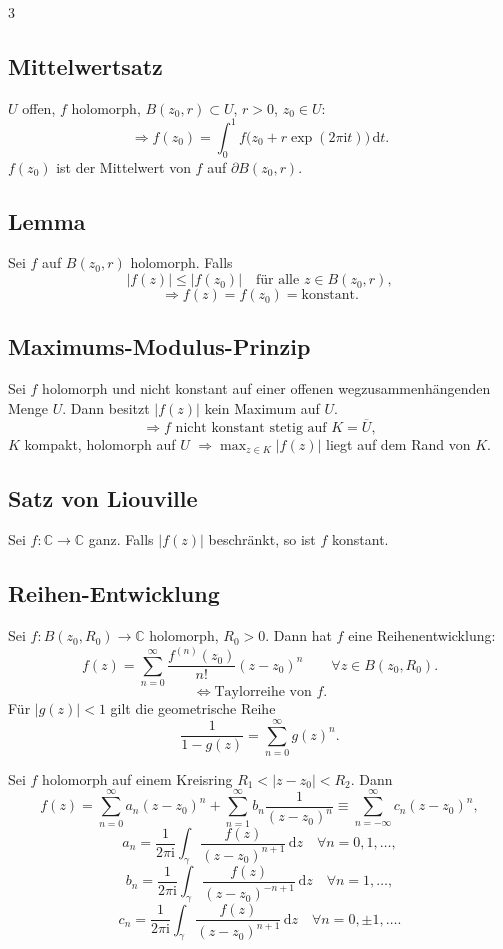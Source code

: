 \documentclass[a4paper,landscape]{article}
\newcommand{\C}{\mathbb C}
\newcommand{\dd}{\,\mathrm d}
\newcommand{\ii}{\mathrm i}
\begin{document}
\begin{multicols*}{3}
\subsection*{Mittelwertsatz}
$U$ offen, $f$ holomorph, $B(z_0,r)\subset U$, $r>0$, $z_0\in U$:
\[
\Rightarrow f(z_0)=\int_0^1 f\bigl(z_0+r\exp(2\pi\ii t)\bigr)\dd t.
\]
$f(z_0)$ ist der Mittelwert von $f$ auf $\partial B(z_0,r)$.

\subsection*{Lemma}
Sei $f$ auf $B(z_0,r)$ holomorph. Falls
\[
|f(z)|\le |f(z_0)|\quad\text{für alle }z\in B(z_0,r),
\]
\[
\Rightarrow f(z)=f(z_0)=\text{konstant}.
\]

\subsection*{Maximums-Modulus-Prinzip}
Sei $f$ holomorph und nicht konstant auf einer offenen wegzusammenhängenden Menge $U$. Dann besitzt $|f(z)|$ kein Maximum auf $U$.
\[
\Rightarrow f\text{ nicht konstant stetig auf }K=\overline U,
\]
$K$ kompakt, holomorph auf $U$ $\Rightarrow \max_{z\in K}|f(z)|$ liegt auf dem Rand von $K$.

\subsection*{Satz von Liouville}
Sei $f:\C\to\C$ ganz. Falls $|f(z)|$ beschränkt, so ist $f$ konstant.

\subsection*{Reihen-Entwicklung}
Sei $f:B(z_0,R_0)\to\C$ holomorph, $R_0>0$. Dann hat $f$ eine Reihenentwicklung:
\[
f(z)=\sum_{n=0}^{\infty}\frac{f^{(n)}(z_0)}{n!}(z-z_0)^n\qquad\forall z\in B(z_0,R_0).
\]
\[
\Leftrightarrow \text{Taylorreihe von }f.
\]
Für $|g(z)|<1$ gilt die geometrische Reihe
\[
\frac{1}{1-g(z)}=\sum_{n=0}^{\infty}g(z)^n.
\]

Sei $f$ holomorph auf einem Kreisring $R_1<|z-z_0|<R_2$. Dann
\[
f(z)=\sum_{n=0}^{\infty}a_n(z-z_0)^n+\sum_{n=1}^{\infty}b_n\frac{1}{(z-z_0)^n}
\equiv \sum_{n=-\infty}^{\infty}c_n(z-z_0)^n,
\]
\[
a_n=\frac{1}{2\pi\ii}\int_\gamma\frac{f(z)}{(z-z_0)^{n+1}}\dd z\quad\forall n=0,1,\ldots,
\]
\[
b_n=\frac{1}{2\pi\ii}\int_\gamma\frac{f(z)}{(z-z_0)^{-n+1}}\dd z\quad\forall n=1,\ldots,
\]
\[
c_n=\frac{1}{2\pi\ii}\int_\gamma\frac{f(z)}{(z-z_0)^{n+1}}\dd z\quad\forall n=0,\pm1,\ldots.
\]


\end{multicols*}
\end{document}
